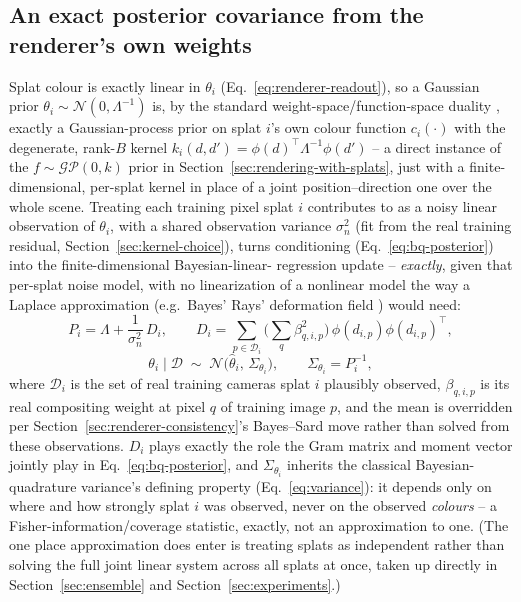 \documentclass[letterpaper,10pt,conference]{ieeeconf}
\begin{document}
\subsection{An exact posterior covariance from the renderer's own weights}
\label{sec:posterior}

Splat colour is exactly linear in $\theta_i$ (Eq.~\eqref{eq:renderer-readout}),
so a Gaussian prior $\theta_i\sim\mathcal N(0,\Lambda^{-1})$ is, by the
standard weight-space/function-space duality \cite{rasmussen2006gaussian},
exactly a Gaussian-process prior on splat $i$'s own colour function
$c_i(\cdot)$ with the degenerate, rank-$B$ kernel
$k_i(d,d')=\phi(d)^\top\Lambda^{-1}\phi(d')$ -- a direct instance of the
$f\sim\mathcal{GP}(0,k)$ prior in Section~\ref{sec:rendering-with-splats},
just with a finite-dimensional, per-splat kernel in place of a joint
position--direction one over the whole scene. Treating each training pixel
splat $i$ contributes to as a noisy linear observation of $\theta_i$, with
a shared observation variance $\sigma_n^2$ (fit from the real training
residual, Section~\ref{sec:kernel-choice}), turns conditioning
(Eq.~\eqref{eq:bq-posterior}) into the finite-dimensional Bayesian-linear-
regression update -- \emph{exactly}, given that per-splat noise model, with
no linearization of a nonlinear model the way a Laplace approximation
(e.g.\ Bayes' Rays' deformation field \cite{goli2024}) would need:
\begin{equation}
    P_i = \Lambda + \frac{1}{\sigma_n^2}\,D_i,
    \qquad
    D_i = \sum_{p\in\mathcal D_i}\Big(\sum_q \beta_{q,i,p}^2\Big)\,
    \phi(d_{i,p})\phi(d_{i,p})^\top,
    \label{eq:sh-precision}
\end{equation}
\begin{equation}
    \theta_i \mid \mathcal D \;\sim\; \mathcal N\big(\hat\theta_i,\,
    \Sigma_{\theta_i}\big), \qquad \Sigma_{\theta_i} = P_i^{-1},
    \label{eq:posterior}
\end{equation}
where $\mathcal D_i$ is the set of real training cameras splat $i$
plausibly observed, $\beta_{q,i,p}$ is its real compositing weight at pixel
$q$ of training image $p$, and the mean is overridden per
Section~\ref{sec:renderer-consistency}'s Bayes--Sard move rather than
solved from these observations. $D_i$ plays exactly the role the Gram
matrix and moment vector jointly play in Eq.~\eqref{eq:bq-posterior}, and
$\Sigma_{\theta_i}$ inherits the classical Bayesian-quadrature variance's
defining property (Eq.~\eqref{eq:variance}): it depends only on where and
how strongly splat $i$ was observed, never on the observed \emph{colours}
-- a Fisher-information/coverage statistic, exactly, not an approximation
to one. (The one place approximation does enter is treating splats as
independent rather than solving the full joint linear system across all
splats at once, taken up directly in Section~\ref{sec:ensemble} and
Section~\ref{sec:experiments}.)
\end{document}
